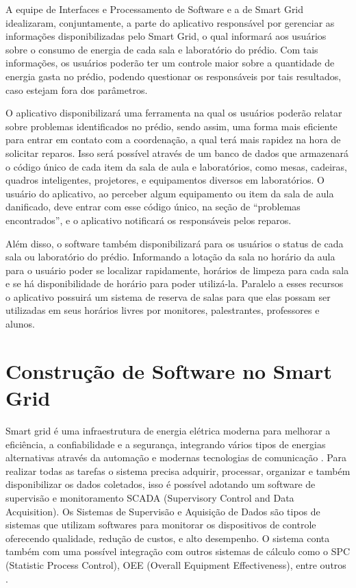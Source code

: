 A equipe de Interfaces e Processamento de Software e a de Smart Grid idealizaram, conjuntamente, a parte do aplicativo responsável por gerenciar as informações disponibilizadas pelo Smart Grid, o qual informará aos usuários sobre o consumo de energia de cada sala e laboratório do prédio. Com tais informações, os usuários poderão ter um controle maior sobre a quantidade de energia gasta no prédio, podendo questionar os responsáveis por tais resultados, caso estejam fora dos parâmetros.

O aplicativo disponibilizará uma ferramenta na qual os usuários poderão relatar sobre problemas identificados no prédio, sendo assim, uma forma mais eficiente para entrar em contato com a coordenação, a qual terá mais rapidez na hora de solicitar reparos. Isso será possível através de um banco de dados que armazenará o código único de cada item da sala de aula e laboratórios, como mesas, cadeiras, quadros inteligentes, projetores, e equipamentos diversos em laboratórios. O usuário do aplicativo, ao perceber algum equipamento ou item da sala de aula danificado, deve entrar com esse código único, na seção de “problemas encontrados”, e o aplicativo notificará os responsáveis pelos reparos.

Além disso, o software também disponibilizará para os usuários o status de cada sala ou laboratório do prédio. Informando a lotação da sala no horário da aula para o usuário poder se localizar rapidamente, horários de limpeza para cada sala e se há disponibilidade de horário para poder utilizá-la. Paralelo a esses recursos o aplicativo possuirá um sistema de reserva de salas para que elas possam ser utilizadas em seus horários livres por monitores, palestrantes, professores e alunos.


		\section{Construção de Software no Smart Grid}

Smart grid é uma infraestrutura de energia elétrica moderna para melhorar a eficiência, a confiabilidade e a segurança, integrando vários tipos de energias alternativas através da automação e modernas tecnologias de comunicação \cite{gunda}. Para realizar todas as tarefas o sistema precisa adquirir, processar, organizar e também disponibilizar os dados coletados, isso é possível adotando um software de supervisão e monitoramento SCADA (Supervisory Control and Data Acquisition). Os Sistemas de Supervisão e Aquisição de Dados são tipos de sistemas que utilizam softwares para monitorar os dispositivos de controle oferecendo qualidade, redução de custos, e alto desempenho. O sistema conta também com uma possível integração com outros sistemas de cálculo como o SPC (Statistic Process Control), OEE (Overall Equipment Effectiveness), entre outros \cite{daneels}.

